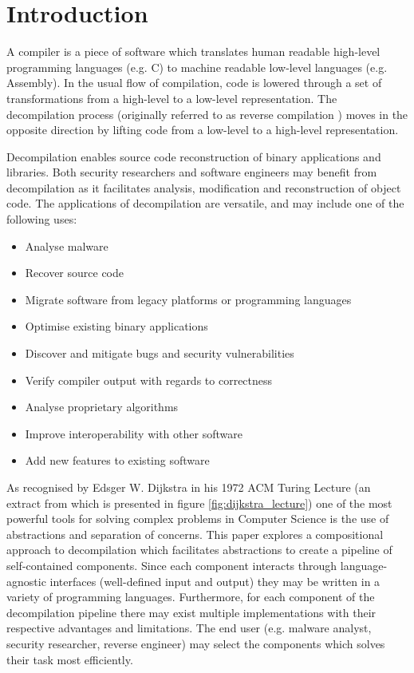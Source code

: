 
\section{Introduction}
\label{sec:introduction}

A compiler is a piece of software which translates human readable high-level programming languages (e.g. C) to machine readable low-level languages (e.g. Assembly). In the usual flow of compilation, code is lowered through a set of transformations from a high-level to a low-level representation. The decompilation process (originally referred to as reverse compilation \cite{reverse_comp}) moves in the opposite direction by lifting code from a low-level to a high-level representation.

Decompilation enables source code reconstruction of binary applications and libraries. Both security researchers and software engineers may benefit from decompilation as it facilitates analysis, modification and reconstruction of object code. The applications of decompilation are versatile, and may include one of the following uses:

\begin{itemize}
	\item Analyse malware
	\item Recover source code
	\item Migrate software from legacy platforms or programming languages
	\item Optimise existing binary applications
	\item Discover and mitigate bugs and security vulnerabilities
	\item Verify compiler output with regards to correctness
	\item Analyse proprietary algorithms
	\item Improve interoperability with other software
	\item Add new features to existing software
\end{itemize}

As recognised by Edsger W. Dijkstra in his 1972 ACM Turing Lecture (an extract from which is presented in figure \ref{fig:dijkstra_lecture}) one of the most powerful tools for solving complex problems in Computer Science is the use of abstractions and separation of concerns. This paper explores a compositional approach to decompilation which facilitates abstractions to create a pipeline of self-contained components. Since each component interacts through language-agnostic interfaces (well-defined input and output) they may be written in a variety of programming languages. Furthermore, for each component of the decompilation pipeline there may exist multiple implementations with their respective advantages and limitations. The end user (e.g. malware analyst, security researcher, reverse engineer) may select the components which solves their task most efficiently.

